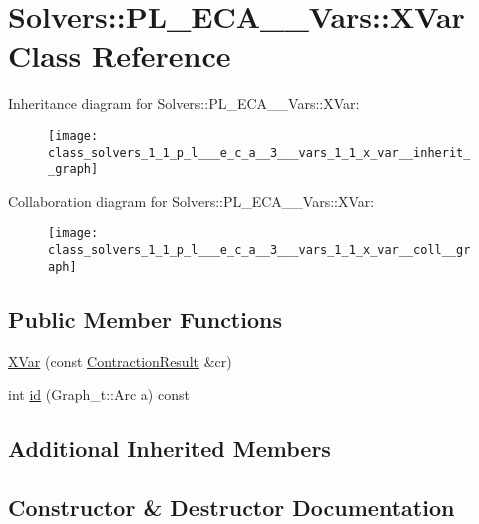 \hypertarget{class_solvers_1_1_p_l___e_c_a__3___vars_1_1_x_var}{}\section{Solvers\+:\+:P\+L\+\_\+\+E\+C\+A\+\_\+\_\+\+Vars\+:\+:X\+Var Class Reference}
\label{class_solvers_1_1_p_l___e_c_a__3___vars_1_1_x_var}


Inheritance diagram for Solvers\+:\+:P\+L\+\_\+\+E\+C\+A\+\_\+\_\+\+Vars\+:\+:X\+Var\+:\nopagebreak
\begin{figure}[H]
\begin{center}
\leavevmode
\texttt{[image: class\_solvers\_1\_1\_p\_l\_\_\_e\_c\_a\_\_3\_\_\_vars\_1\_1\_x\_var\_\_inherit\_\_graph]}
\end{center}
\end{figure}


Collaboration diagram for Solvers\+:\+:P\+L\+\_\+\+E\+C\+A\+\_\+\_\+\+Vars\+:\+:X\+Var\+:\nopagebreak
\begin{figure}[H]
\begin{center}
\leavevmode
\texttt{[image: class\_solvers\_1\_1\_p\_l\_\_\_e\_c\_a\_\_3\_\_\_vars\_1\_1\_x\_var\_\_coll\_\_graph]}
\end{center}
\end{figure}
\subsection*{Public Member Functions}
\begin{DoxyCompactItemize}
\item 
\hyperlink{class_solvers_1_1_p_l___e_c_a__3___vars_1_1_x_var_ac0c0fea297210b645898c2833f5b09bf}{X\+Var} (const \hyperlink{class_contraction_result}{Contraction\+Result} \&cr)
\item 
int \hyperlink{class_solvers_1_1_p_l___e_c_a__3___vars_1_1_x_var_afc73a3fef1f414fbc4e10aaaf3d512d2}{id} (Graph\+\_\+t\+::\+Arc a) const
\end{DoxyCompactItemize}
\subsection*{Additional Inherited Members}


\subsection{Constructor \& Destructor Documentation}
\mbox{\label{class_solvers_1_1_p_l___e_c_a__3___vars_1_1_x_var_ac0c0fea297210b645898c2833f5b09bf}} 
